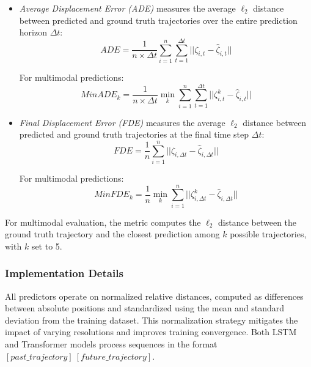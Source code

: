 \begin{itemize}
  \item \textit{Average Displacement Error (ADE)} measures the average $\ell_2$ distance between predicted and ground truth trajectories over the entire prediction horizon $\Delta t$:
    \begin{equation*}
        ADE = \frac{1}{n \times \Delta t} \sum_{i=1}^{n} \sum_{t=1}^{\Delta t} ||\zeta_{i,t} - \hat{\zeta}_{i,t}||
    \end{equation*}

    For multimodal predictions:
    \begin{equation*}
        MinADE_k = \frac{1}{n \times \Delta t} \min_{k} \sum_{i=1}^{n} \sum_{t=1}^{\Delta t} ||\zeta^k_{i,t} - \hat{\zeta}_{i,t}||
    \end{equation*}

  \item \textit{Final Displacement Error (FDE)} measures the average $\ell_2$ distance between predicted and ground truth trajectories at the final time step $\Delta t$:
    \begin{equation*}
        FDE = \frac{1}{n} \sum_{i=1}^{n} ||\zeta_{i, \Delta t} - \hat{\zeta}_{i, \Delta t}||
    \end{equation*}

    For multimodal predictions:
    \begin{equation*}
        MinFDE_k = \frac{1}{n} \min_{k} \sum_{i=1}^{n} ||\zeta^k_{i, \Delta t} - \hat{\zeta}_{i, \Delta t}||
    \end{equation*}
\end{itemize}

For multimodal evaluation, the metric computes the $\ell_2$ distance between the ground truth trajectory and the closest prediction among $k$ possible trajectories, with $k$ set to 5.
\subsubsection{Implementation Details}
All predictors operate on normalized relative distances, computed as differences between absolute positions and standardized using the mean and standard deviation from the training dataset. This normalization strategy mitigates the impact of varying resolutions and improves training convergence. Both LSTM and Transformer models process sequences in the format \([past\_trajectory]\ [future\_trajectory]\).

